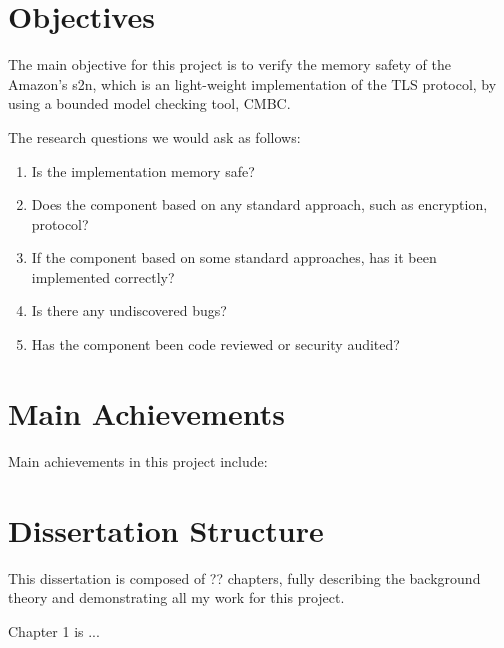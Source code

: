 \section{Objectives}
The main objective for this project is to verify the memory safety of the Amazon's s2n, which is an light-weight implementation of the TLS protocol, by using a bounded model checking tool, CMBC.


The research questions we would ask as follows:

\begin{enumerate}
    \item Is the implementation memory safe?
    \item Does the component based on any standard approach, such as encryption, protocol?
    \item If the component based on some standard approaches, has it been implemented correctly?
    \item Is there any undiscovered bugs?
    \item Has the component been code reviewed or security audited?
\end{enumerate}


\section{Main Achievements}
Main achievements in this project include:

\section{Dissertation Structure}
This dissertation is composed of ?? chapters, fully describing the background theory and demonstrating all my work for this project.

Chapter 1 is ...